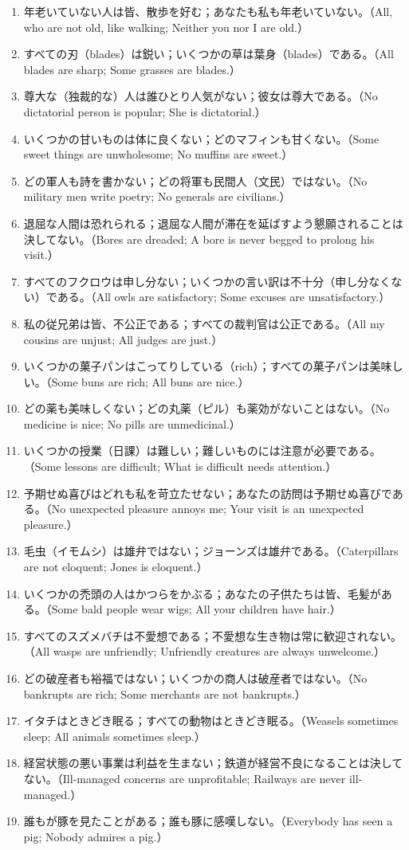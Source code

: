 \documentclass[a4paper,11pt,openany]{ltjsbook}
\begin{document}
\begin{enumerate}[label=\textbf{\arabic*.}]
\item 年老いていない人は皆、散歩を好む；あなたも私も年老いていない。（All, who are not old, like walking; Neither you nor I are old.）
\item すべての刃（blades）は鋭い；いくつかの草は葉身（blades）である。（All blades are sharp; Some grasses are blades.）
\item 尊大な（独裁的な）人は誰ひとり人気がない；彼女は尊大である。（No dictatorial person is popular; She is dictatorial.）
\item いくつかの甘いものは体に良くない；どのマフィンも甘くない。（Some sweet things are unwholesome; No muffins are sweet.）
\item どの軍人も詩を書かない；どの将軍も民間人（文民）ではない。（No military men write poetry; No generals are civilians.）
\item 退屈な人間は恐れられる；退屈な人間が滞在を延ばすよう懇願されることは決してない。（Bores are dreaded; A bore is never begged to prolong his visit.）
\item すべてのフクロウは申し分ない；いくつかの言い訳は不十分（申し分なくない）である。（All owls are satisfactory; Some excuses are unsatisfactory.）
\item 私の従兄弟は皆、不公正である；すべての裁判官は公正である。（All my cousins are unjust; All judges are just.）
\item いくつかの菓子パンはこってりしている（rich）；すべての菓子パンは美味しい。（Some buns are rich; All buns are nice.）
\item どの薬も美味しくない；どの丸薬（ピル）も薬効がないことはない。（No medicine is nice; No pills are unmedicinal.）
\item いくつかの授業（日課）は難しい；難しいものには注意が必要である。（Some lessons are difficult; What is difficult needs attention.）
\item 予期せぬ喜びはどれも私を苛立たせない；あなたの訪問は予期せぬ喜びである。（No unexpected pleasure annoys me; Your visit is an unexpected pleasure.）
\item 毛虫（イモムシ）は雄弁ではない；ジョーンズは雄弁である。（Caterpillars are not eloquent; Jones is eloquent.）
\item いくつかの禿頭の人はかつらをかぶる；あなたの子供たちは皆、毛髪がある。（Some bald people wear wigs; All your children have hair.）
\item すべてのスズメバチは不愛想である；不愛想な生き物は常に歓迎されない。（All wasps are unfriendly; Unfriendly creatures are always unwelcome.）
\item どの破産者も裕福ではない；いくつかの商人は破産者ではない。（No bankrupts are rich; Some merchants are not bankrupts.）
\item イタチはときどき眠る；すべての動物はときどき眠る。（Weasels sometimes sleep; All animals sometimes sleep.）
\item 経営状態の悪い事業は利益を生まない；鉄道が経営不良になることは決してない。（Ill-managed concerns are unprofitable; Railways are never ill-managed.）
\item 誰もが豚を見たことがある；誰も豚に感嘆しない。（Everybody has seen a pig; Nobody admires a pig.）
\end{enumerate}
\end{document}

